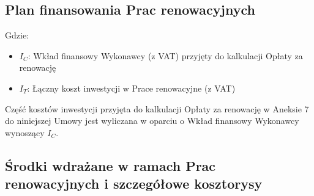 \begin{center}
\end{center}


\subsection{Plan finansowania Prac renowacyjnych}
\begin{center}
\end{center}

Gdzie:
\begin{itemize}
	\item $I_C$: Wkład finansowy Wykonawcy (z VAT) przyjęty do kalkulacji Opłaty za renowację
	\item $I_T$: Łączny koszt inwestycji w Prace renowacyjne (z VAT)
\end{itemize}

  Część kosztów inwestycji przyjęta do kalkulacji Opłaty za renowację w Aneksie 7 do niniejszej Umowy jest wyliczana w oparciu o Wkład finansowy Wykonawcy wynoszący $I_C$.

\subsection{Środki wdrażane w ramach Prac renowacyjnych i szczegółowe kosztorysy}

